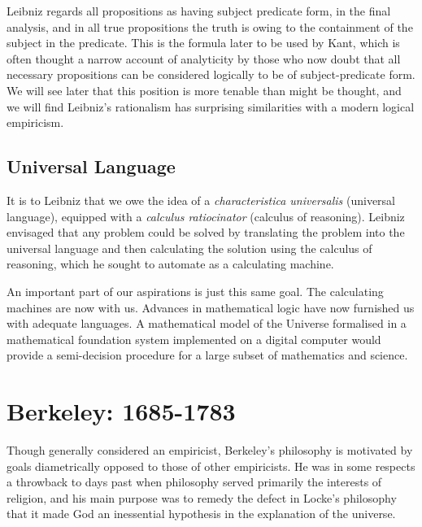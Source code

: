 Leibniz regards all propositions as having subject predicate form, in the final analysis, and in all true propositions the truth is owing to the containment of the subject in the predicate.
This is the formula later to be used by Kant, which is often thought a narrow account of analyticity by those who now doubt that all necessary propositions can be considered logically to be of subject-predicate form.
We will see later that this position is more tenable than might be thought, and we will find Leibniz's rationalism has surprising similarities with a modern logical empiricism.


\subsection{Universal Language}

It is to Leibniz that we owe the idea of a {\it characteristica universalis} (universal language), equipped with a {\it calculus ratiocinator} (calculus of reasoning).
Leibniz envisaged that any problem could be solved by translating the problem into the universal language and then calculating the solution using the calculus of reasoning, which he sought to automate as a calculating machine.

An important part of our aspirations is just this same goal.
The calculating machines are now with us.
Advances in mathematical logic have now furnished us with adequate languages.
A mathematical model of the Universe formalised in a mathematical foundation system implemented on a digital computer would provide a semi-decision procedure for a large subset of mathematics and science.


\section{Berkeley: 1685-1783}

Though generally considered an empiricist, Berkeley's philosophy is motivated by goals diametrically opposed to those of other empiricists.
He was in some respects a throwback to days past when philosophy served primarily the interests of religion, and his main purpose was to remedy the defect in Locke's philosophy that it made God an inessential hypothesis in the explanation of the universe.

